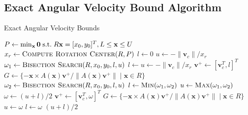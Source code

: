 \documentclass[conference]{IEEEtran}
\makeatletter
\def\BState{\State\hskip-\ALG@thistlm}
\newcommand{\EH}[1]{{\color{blue} {Eric: {#1}}  }}
\makeatother
\begin{document}


\subsection{Exact Angular Velocity Bound
  Algorithm}\label{sec:exact-ang-vel-bound-alg}

\begin{algorithm}
\caption{Exact Angular Velocity Bounds}\label{alg:angular-velocity-bounds}
\begin{algorithmic}[1]
 \Return {$[0,0]$}
\EndIf
\State $P \gets \min_\mathbf{x} \mathbf{0} \text{\;s.t.\;} R\mathbf{x} = [x_0,y_0]^T,  L \leq \mathbf{x} \leq U$
\State $x_r \gets \Call{Compute Rotation Center}{R,P}$
\State $l \gets 0$
\State $u \gets -\lVert\mathbf{v}_c\rVert/x_r$
\State $\omega_1 \gets \Call{Bisection Search}{R,x_0,y_0,l,u}$
\State $l \gets u \gets -\lVert\mathbf{v}_c\rVert/x_r$
\Do%
\State $\mathbf{v}^+ \gets [\mathbf{v}_c^T, l]^T$
\State $G \gets \{-\mathbf{x}\times A(\mathbf{x})\mathbf{v}^+ / \lVert A(\mathbf{x})\mathbf{v}^+ \rVert \;|\; \mathbf{x} \in R\}$
\State $\omega_2 \gets \Call{Bisection Search}{R,x_0,y_0,l,u}$
\State $l \gets \Call{Min}{\omega_1,\omega_2}$
\State $u \gets \Call{Max}{\omega_1,\omega_2}$
\State \Return {$[l, u]$}
\EndFunction
% 
\State $\omega \gets (u+l)/2$
\State $\mathbf{v}^+ \gets [\mathbf{v}_c^T, \omega]^T$
\State $G \gets \{-\mathbf{x}\times A(\mathbf{x})\mathbf{v}^+ / \lVert A(\mathbf{x})\mathbf{v}^+ \rVert \;|\; \mathbf{x} \in R\}$
\State $u \gets \omega$
\Else{} 
\State $l \gets \omega$
\EndIf
\EndWhile
\State \Return $(u+l)/2$
\EndFunction
\end{algorithmic}
\end{algorithm}

\end{document}

